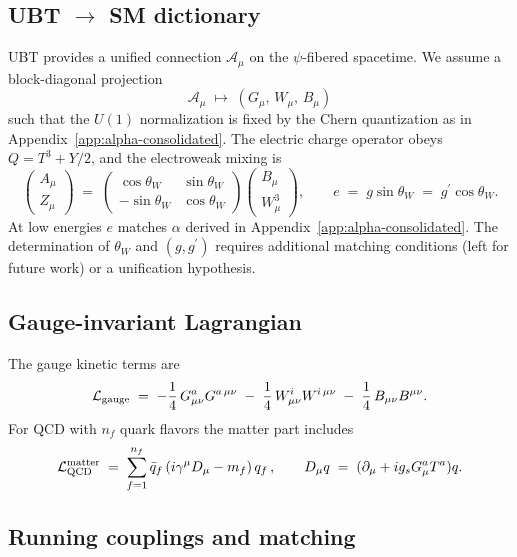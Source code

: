 \subsection{UBT $\to$ SM dictionary}
UBT provides a unified connection $\mathcal{A}_\mu$ on the $\psi$-fibered spacetime. We assume a block-diagonal projection
\begin{equation}
\mathcal{A}_\mu \;\longmapsto\; (G_\mu,\, W_\mu,\, B_\mu)
\end{equation}
such that the $U(1)$ normalization is fixed by the Chern quantization as in Appendix~\ref{app:alpha-consolidated}.
The electric charge operator obeys $Q = T^3 + Y/2$, and the electroweak mixing is
\begin{equation}
\begin{pmatrix} A_\mu \\ Z_\mu \end{pmatrix} \;=\;
\begin{pmatrix} \cos\theta_W & \sin\theta_W \\ -\sin\theta_W & \cos\theta_W \end{pmatrix}
\begin{pmatrix} B_\mu \\ W^3_\mu \end{pmatrix},
\qquad
e \;=\; g \sin\theta_W \;=\; g^\prime \cos\theta_W.
\end{equation}
At low energies $e$ matches $\alpha$ derived in Appendix~\ref{app:alpha-consolidated}. The determination of $\theta_W$ and $(g,g^\prime)$
requires additional matching conditions (left for future work) or a unification hypothesis.

\subsection{Gauge-invariant Lagrangian}
The gauge kinetic terms are
\begin{equation}
\mathcal{L}_{\rm gauge} \;=\; -\frac{1}{4}\,G_{\mu\nu}^a G^{a\,\mu\nu} \;-\; \frac{1}{4}\,W_{\mu\nu}^i W^{i\,\mu\nu} \;-\; \frac{1}{4}\,B_{\mu\nu} B^{\mu\nu}.
\end{equation}
For QCD with $n_f$ quark flavors the matter part includes
\begin{equation}
\mathcal{L}_{\rm QCD}^{\rm matter} \;=\; \sum_{f=1}^{n_f} \bar{q}_f\,(i\gamma^\mu D_\mu - m_f)\,q_f\,,
\qquad D_\mu q \;=\; (\partial_\mu + i g_s G_\mu^a T^a)q.
\end{equation}

\subsection{Running couplings and matching}
